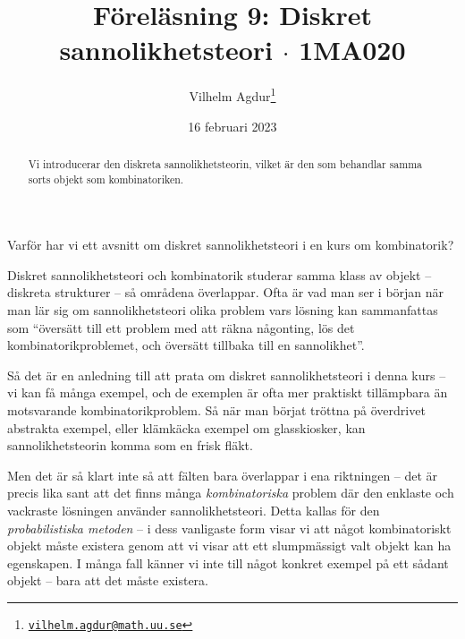 \documentclass[nobib]{tufte-handout}
\title{Föreläsning 9: Diskret sannolikhetsteori $\cdot$ 1MA020}
\author[Vilhelm Agdur]{Vilhelm Agdur\thanks{\href{mailto:vilhelm.agdur@math.uu.se}{\nolinkurl{vilhelm.agdur@math.uu.se}}}}
\date{16 februari 2023}
\begin{document}

\maketitle%

\begin{abstract}
\noindent
Vi introducerar den diskreta sannolikhetsteorin, vilket är den som behandlar samma sorts objekt som kombinatoriken.
\end{abstract}

Varför har vi ett avsnitt om diskret sannolikhetsteori i en kurs om kombinatorik? 

Diskret sannolikhetsteori och kombinatorik studerar samma klass av objekt -- diskreta strukturer -- så områdena överlappar. Ofta är vad man ser i början när man lär sig om sannolikhetsteori olika problem vars lösning kan sammanfattas som ``översätt till ett problem med att räkna någonting, lös det kombinatorikproblemet, och översätt tillbaka till en sannolikhet''. 

Så det är en anledning till att prata om diskret sannolikhetsteori i denna kurs -- vi kan få många exempel, och de exemplen är ofta mer praktiskt tillämpbara än motsvarande kombinatorikproblem. Så när man börjat tröttna på överdrivet abstrakta exempel, eller klämkäcka exempel om glasskiosker, kan sannolikhetsteorin komma som en frisk fläkt.

Men det är så klart inte så att fälten bara överlappar i ena riktningen -- det är precis lika sant att det finns många \emph{kombinatoriska} problem där den enklaste och vackraste lösningen använder sannolikhetsteori. Detta kallas för den \emph{probabilistiska metoden} -- i dess vanligaste form visar vi att något kombinatoriskt objekt måste existera genom att vi visar att ett slumpmässigt valt objekt kan ha egenskapen. I många fall känner vi inte till något konkret exempel på ett sådant objekt -- bara att det måste existera.
\end{document}
